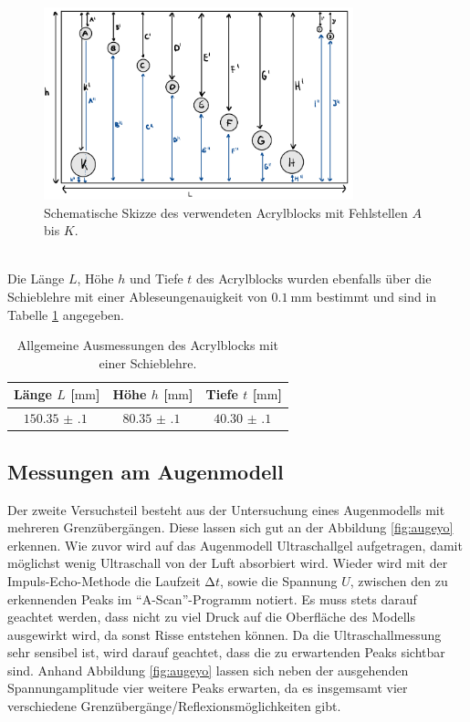 \begin{figure}
    \centering
    \includegraphics[width=0.8\textwidth]{bilderlit/skizze.png}
    \caption{Schematische Skizze des verwendeten Acrylblocks mit Fehlstellen $A$ bis $K$.} 
    \label{fig:skizzeyo}
\end{figure}
\mbox{}
\\
Die Länge $L$, Höhe $h$ und Tiefe $t$ des Acrylblocks wurden ebenfalls über die Schieblehre mit einer Ableseungenauigkeit von $\SI{0.1}{\milli\meter}$
bestimmt und sind in Tabelle \ref{tab:ausmessunggrob} angegeben.

\begin{table}
    \centering
    \caption{Allgemeine Ausmessungen des Acrylblocks mit einer Schieblehre.}
    \label{tab:ausmessunggrob}
    \begin{tabular}{c c c}
        \toprule
        Länge  $L$ [$\si{\milli\meter}$] & Höhe $h$ [$\si{\milli\meter}$]& Tiefe $t$ [$\si{\milli\meter}$] \\
        \midrule
        $\SI{150.35(10)}{}$ & $\SI{80.35(10)}{}$ & $\SI{40.30(10)}{}$ \\
        \bottomrule
    \end{tabular}
\end{table}

\subsection{Messungen am Augenmodell}

Der zweite Versuchsteil besteht aus der Untersuchung eines Augenmodells mit mehreren Grenzübergängen. Diese lassen sich gut an der Abbildung \ref{fig:augeyo} erkennen. Wie zuvor wird auf das Augenmodell Ultraschallgel aufgetragen, damit möglichst wenig
Ultraschall von der Luft absorbiert wird. Wieder wird mit der Impuls-Echo-Methode die Laufzeit $\increment t$, sowie die Spannung $U$, zwischen den zu erkennenden Peaks im \enquote{A-Scan}-Programm notiert. Es muss stets darauf geachtet werden, dass
nicht zu viel Druck auf die Oberfläche des Modells ausgewirkt wird, da sonst Risse entstehen können. Da die Ultraschallmessung sehr sensibel ist, wird darauf geachtet, dass die zu erwartenden Peaks sichtbar sind. Anhand Abbildung \ref{fig:augeyo} lassen sich
neben der ausgehenden Spannungamplitude vier weitere Peaks erwarten, da es insgemsamt vier verschiedene Grenzübergänge/Reflexionsmöglichkeiten gibt.


